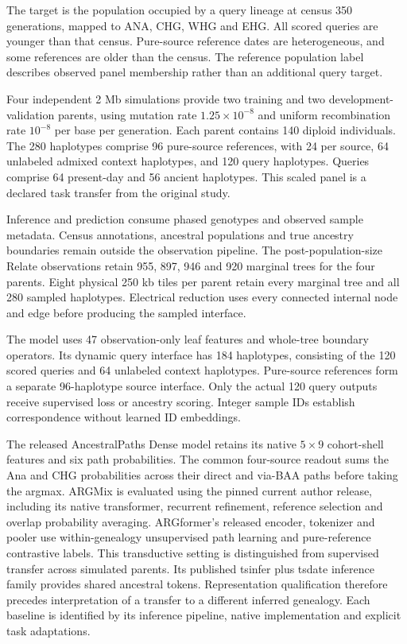 \documentclass[letterpaper]{article}
\begin{document}
The target is the population occupied by a query lineage at census 350 generations, mapped to ANA, CHG, WHG and EHG. All scored queries are younger than that census. Pure-source reference dates are heterogeneous, and some references are older than the census. The reference population label describes observed panel membership rather than an additional query target.

Four independent 2 Mb simulations provide two training and two development-validation parents, using mutation rate $1.25\times10^{-8}$ and uniform recombination rate $10^{-8}$ per base per generation. Each parent contains 140 diploid individuals. The 280 haplotypes comprise 96 pure-source references, with 24 per source, 64 unlabeled admixed context haplotypes, and 120 query haplotypes. Queries comprise 64 present-day and 56 ancient haplotypes. This scaled panel is a declared task transfer from the original study.

Inference and prediction consume phased genotypes and observed sample metadata. Census annotations, ancestral populations and true ancestry boundaries remain outside the observation pipeline. The post-population-size Relate observations retain 955, 897, 946 and 920 marginal trees for the four parents. Eight physical 250 kb tiles per parent retain every marginal tree and all 280 sampled haplotypes. Electrical reduction uses every connected internal node and edge before producing the sampled interface.

The model uses 47 observation-only leaf features and whole-tree boundary operators. Its dynamic query interface has 184 haplotypes, consisting of the 120 scored queries and 64 unlabeled context haplotypes. Pure-source references form a separate 96-haplotype source interface. Only the actual 120 query outputs receive supervised loss or ancestry scoring. Integer sample IDs establish correspondence without learned ID embeddings.

The released AncestralPaths Dense model retains its native $5\times9$ cohort-shell features and six path probabilities. The common four-source readout sums the Ana and CHG probabilities across their direct and via-BAA paths before taking the argmax. ARGMix is evaluated using the pinned current author release, including its native transformer, recurrent refinement, reference selection and overlap probability averaging. ARGformer's released encoder, tokenizer and pooler use within-genealogy unsupervised path learning and pure-reference contrastive labels. This transductive setting is distinguished from supervised transfer across simulated parents. Its published tsinfer plus tsdate inference family provides shared ancestral tokens. Representation qualification therefore precedes interpretation of a transfer to a different inferred genealogy. Each baseline is identified by its inference pipeline, native implementation and explicit task adaptations.
\end{document}
